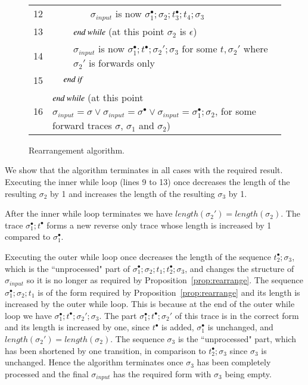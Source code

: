 \begin{subappendices}
\begin{pf}
\begin{figure}[t]
{\begin{tabular}{ p{.5cm} p{1cm} p{1cm} p{1cm} l }
  12 & \qquad & \qquad & \qquad & \multicolumn{1}{p{8cm}}{$\sigma_{input}$ is now $\sigma_1^\bullet;\sigma_2;t_3^\bullet;t_4;\sigma_3$}\\
  13 & \qquad & \qquad & \multicolumn{2}{p{9cm}}{$\emph{end while }$(at this point $\sigma_2$ is $\epsilon$)}\\
  14 & \qquad & \qquad & \multicolumn{2}{p{9cm}}{$\sigma_{input}$ is now $\sigma_1^\bullet;t^\bullet;\sigma_2';\sigma_3$ for some $t, \sigma_2'$ where $\sigma_2'$ is forwards only} \\
  15 & \qquad & \multicolumn{3}{p{10cm}}{$\emph{end if}$}\\
  16 & \multicolumn{4}{p{11cm}}{$\emph{end while }$(at this point $\sigma_{input} = \sigma \lor \sigma_{input} = \sigma^\bullet \lor \sigma_{input} = \sigma_1^\bullet;\sigma_2$, for some forward traces $\sigma$, $\sigma_1$ and $\sigma_2$)}\\
\end{tabular}}
\caption{Rearrangement algorithm.}
\label{rearrangement-algorithm}
\end{figure}

We show that the algorithm terminates in all cases with the required result. Executing 
the inner while loop (lines 9 to 13) once decreases the length of the resulting $\sigma_2$ by 1 and increases the length of the resulting $\sigma_3$ by 1.

After the inner while loop terminates we have $length(\sigma_2')=length(\sigma_2)$. 
The trace $\sigma_1^\bullet;t^\bullet$ forms a new reverse only trace whose length is increased 
by 1 compared to $\sigma_1^\bullet$. 

Executing the outer while loop once decreases the length of the sequence $t_2^\bullet;\sigma_3$,
which is the ``unprocessed" part of $\sigma_1^\bullet;\sigma_2;t_1;t_2^\bullet;\sigma_3$,
and changes the structure of $\sigma_{input}$ so it is no longer as required by
Proposition~\ref{prop:rearrange}. The sequence $\sigma_1^\bullet;\sigma_2;t_1$ is of the form required by Proposition~\ref{prop:rearrange} and its length is increased by the outer while loop. This is because at the end of the outer while loop we have $\sigma_1^\bullet;t^\bullet;\sigma_2';\sigma_3$. 
The part $\sigma_1^\bullet;t^\bullet;\sigma_2'$ of this trace is in the correct form and 
its length is increased by one, since $t^\bullet$ is added, $\sigma_1^\bullet$ is unchanged,
and $length(\sigma_2')=length(\sigma_2)$. The sequence $\sigma_3$ is the ``unprocessed" part, which has been shortened by one transition, in comparison to $t_2^\bullet;\sigma_3$ since $\sigma_3$ is unchanged. Hence the algorithm terminates once $\sigma_3$ has been completely processed and the final $\sigma_{input}$ has the required form with $\sigma_3$ being empty.


\end{pf}
\end{subappendices}
